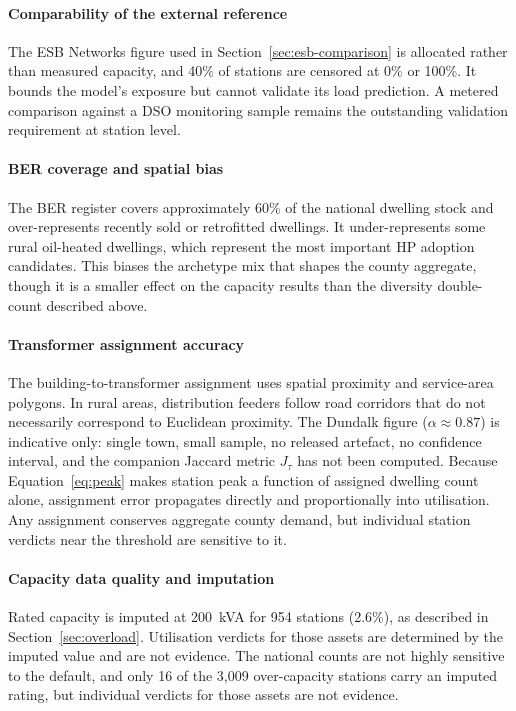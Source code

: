 \documentclass[preprint,12pt]{elsarticle}
\begin{document}
\paragraph{Comparability of the external reference}
The ESB Networks figure used in Section~\ref{sec:esb-comparison} is allocated
rather than measured capacity, and 40\% of stations are censored at 0\% or
100\%. It bounds the model's exposure but cannot validate its load
prediction. A metered comparison against a DSO monitoring sample remains the
outstanding validation requirement at station level.

\paragraph{BER coverage and spatial bias}
The BER register covers approximately 60\% of the national dwelling stock
and over-represents recently sold or retrofitted dwellings.
It under-represents some rural oil-heated dwellings, which represent the
most important HP adoption candidates.
This biases the archetype mix that shapes the county aggregate, though it is
a smaller effect on the capacity results than the diversity double-count
described above.

\paragraph{Transformer assignment accuracy}
The building-to-transformer assignment uses spatial proximity and
service-area polygons.
In rural areas, distribution feeders follow road corridors that do not
necessarily correspond to Euclidean proximity.
The Dundalk figure ($\alpha \approx 0.87$) is indicative only: single town,
small sample, no released artefact, no confidence interval, and the
companion Jaccard metric $J_\tau$ has not been computed.
Because Equation~\eqref{eq:peak} makes station peak a function of assigned
dwelling count alone, assignment error propagates directly and
proportionally into utilisation. Any assignment conserves aggregate county
demand, but individual station verdicts near the threshold are sensitive to
it.

\paragraph{Capacity data quality and imputation}
Rated capacity is imputed at 200~kVA for 954 stations (2.6\%), as described
in Section~\ref{sec:overload}. Utilisation verdicts for those assets are
determined by the imputed value and are not evidence. The national counts
are not highly sensitive to the default, and only 16 of the 3,009
over-capacity stations carry an imputed rating, but individual verdicts for
those assets are not evidence.
\end{document}
